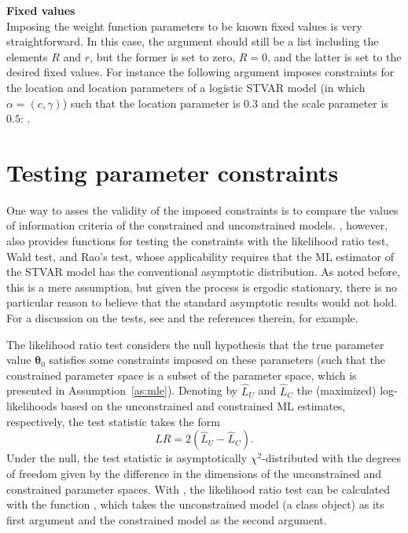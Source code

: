 \documentclass[nojss]{jss}
\begin{document}
\textbf{Fixed values}\\
Imposing the weight function parameters to be known fixed values is very straightforward. In this case, the argument  should still be a list including the elements $R$ and $r$, but the former is set to zero, $R=0$, and the latter is set to the desired fixed values. For instance the following argument imposes constraints for the location and location parameters of a logistic STVAR model (in which $\alpha = (c,\gamma)$) such that the location parameter is $0.3$ and the scale parameter is $0.5$: .

\section{Testing parameter constraints}\label{sec:testconst}

One way to asses the validity of the imposed constraints is to compare the values of information criteria of the constrained and unconstrained models. , however, also provides functions for testing the constraints with the likelihood ratio test, Wald test, and Rao's test, whose applicability requires that the ML estimator of the STVAR model has the conventional asymptotic distribution. As noted before, this is a mere assumption, but given the process is ergodic stationary, there is no particular reason to believe that the standard asymptotic results would not hold. For a discussion on the tests, see \citet{Buse:1982} and the references therein, for example.

The likelihood ratio test considers the null hypothesis that the true parameter value $\boldsymbol{\theta}_0$ satisfies some constraints imposed on these parameters (such that the constrained parameter space is a subset of the parameter space, which is presented in Assumption~\ref{as:mle}). Denoting by $\hat{L}_U$ and $\hat{L}_C$ the (maximized) log-likelihoods based on the unconstrained and constrained ML estimates, respectively, the test statistic takes the form
\begin{equation}
LR=2(\hat{L}_U - \hat{L}_C).
\end{equation}
Under the null, the test statistic is asymptotically $\chi^2$-distributed with the degrees of freedom given by the difference in the dimensions of the unconstrained and constrained parameter spaces. With , the likelihood ratio test can be calculated with the function , which takes the unconstrained model (a class  object) as its first argument and the constrained model as the second argument.
\end{document}
